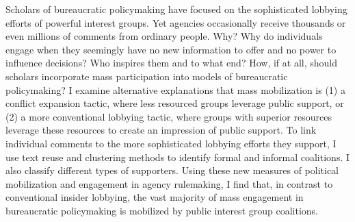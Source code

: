 Scholars of bureaucratic policymaking have focused on the sophisticated lobbying efforts of powerful interest groups. Yet agencies occasionally receive thousands or even millions of comments from ordinary people. Why? Why do individuals engage when they seemingly have no new information to offer and no power to influence decisions? Who inspires them and to what end? How, if at all, should scholars incorporate mass participation into models of bureaucratic policymaking? 
I examine alternative explanations that mass mobilization is (1) a conflict expansion tactic, where less resourced groups leverage public support, or (2) a more conventional lobbying tactic, where groups with superior resources leverage these resources to create an impression of public support. 
To link individual comments to the more sophisticated lobbying efforts they support, I use text reuse and clustering methods to identify formal and informal coalitions. I also classify different types of supporters. Using these new measures of political mobilization and engagement in agency rulemaking, I find that, in contrast to conventional insider lobbying, the vast majority of mass engagement in bureaucratic policymaking is mobilized by public interest group coalitions.
